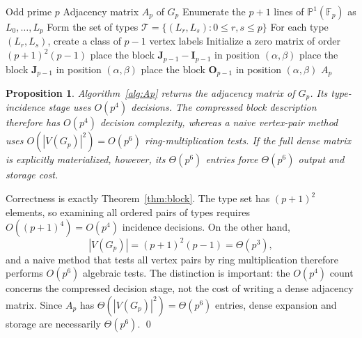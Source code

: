 \documentclass[12pt]{article}
\renewenvironment{proof}{{\bf \noindent Proof.}}{\qed}
\newtheorem{proposition}[theorem]{Proposition}
\theoremstyle{definition}
\newcommand{\F}{\mathbb{F}}
\newcommand{\PP}{\mathbb{P}}
\newcommand{\calT}{\mathcal{T}}
\newcommand{\I}{\mathbf{I}}
\newcommand{\J}{\mathbf{J}}
\renewcommand{\O}{\mathbf{O}}
\begin{document}
	\begin{algorithm}[H]
		\caption{Structured construction of $A_p$ for an odd prime $p$}
		\label{alg:Ap}
		\begin{algorithmic}[1]
			\Require Odd prime $p$
			\Ensure Adjacency matrix $A_p$ of $G_p$
			\State Enumerate the $p+1$ lines of $\PP^1(\F_p)$ as $L_0,\dots,L_p$
			\State Form the set of types $\calT=\{(L_r,L_s):0\le r,s\le p\}$
			\State For each type $(L_r,L_s)$, create a class of $p-1$ vertex labels
			\State Initialize a zero matrix of order $(p+1)^2(p-1)$
			\State place the block $\J_{p-1}-\I_{p-1}$ in position $(\alpha,\beta)$
			\State place the block $\J_{p-1}$ in position $(\alpha,\beta)$
			\Else
			\State place the block $\O_{p-1}$ in position $(\alpha,\beta)$
			\EndIf
			\EndFor
			\State \Return $A_p$
		\end{algorithmic}
	\end{algorithm}
	
	\begin{proposition}\label{prop:algcorrect}
		Algorithm~\ref{alg:Ap} returns the adjacency matrix of $G_p$. Its type-incidence stage uses $O(p^4)$ decisions. The compressed block description therefore has $O(p^4)$ decision complexity, whereas a naive vertex-pair method uses $O(|V(G_p)|^2)=O(p^6)$ ring-multiplication tests. If the full dense matrix is explicitly materialized, however, its $\Theta(p^6)$ entries force $\Theta(p^6)$ output and storage cost.
	\end{proposition}
	
	\begin{proof}
		Correctness is exactly Theorem~\ref{thm:block}. The type set has $(p+1)^2$ elements, so examining all ordered pairs of types requires $O((p+1)^4)=O(p^4)$ incidence decisions. On the other hand,
		$$
		|V(G_p)|=(p+1)^2(p-1)=\Theta(p^3),
		$$
		and a naive method that tests all vertex pairs by ring multiplication therefore performs $O(p^6)$ algebraic tests. The distinction is important: the $O(p^4)$ count concerns the compressed decision stage, not the cost of writing a dense adjacency matrix. Since $A_p$ has $\Theta(|V(G_p)|^2)=\Theta(p^6)$ entries, dense expansion and storage are necessarily $\Theta(p^6)$.
	\end{proof}
	
\end{document}
